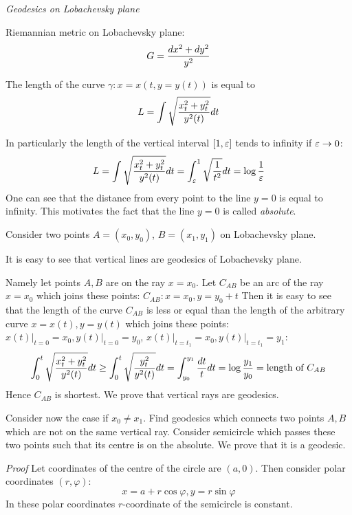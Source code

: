 \documentclass[12pt]{article}
\theoremstyle{theorem}
\numberwithin{equation}{section}
\begin{document}
{\bigskip

     {\it Geodesics on Lobachevsky plane}

     Riemannian metric on Lobachevsky plane:
            \begin{equation}\label{lobachmetric5}
               G={dx^2+dy^2\over y^2}
            \end{equation}



The length of the curve $\gamma\colon x=x(t, y=y(t))$ is equal to
                     $$
   L=\int\sqrt {{x_t^2+y_t^2\over y^2(t)}}dt
                        $$

In particularly the length of the vertical interval $[1,{\varepsilon}]$ tends
to infinity if ${\varepsilon}\to 0$:
                    $$
   L=\int\sqrt {{x_t^2+y_t^2\over y^2(t)}}dt=
   \int_{\varepsilon}^1\sqrt {{1\over t^2}}dt=\log {1\over {\varepsilon}}
                     $$
One can see that the distance from  every point to the line $y=0$ is
equal to infinity. This motivates the fact that the line $y=0$
is called {\it absolute}.

Consider two points $A=(x_0,y_0)$, $B=(x_1,y_1)$ on Lobachevsky plane.


It is easy to see that vertical lines are geodesics of Lobachevsky plane.

Namely let points $A, B$ are on the ray $x=x_0$.
Let  $C_{AB}$ be an arc of the ray $x=x_0$ which joins these points:
    $C_{AB}\colon x=x_0, y=y_0+t$
Then it is easy to see that the length of the curve $C_{AB}$ is less or equal than the length of the arbitrary curve
  $x=x(t),y=y(t)$ which joins these points: $x(t)\big\vert_{t=0}=x_0, y(t)\big\vert_{t=0}=y_0$,
$x(t)\big\vert_{t=t_1}=x_0, y(t)\big\vert_{t=t_1}=y_1$:
          $$
 \int_{0}^t\sqrt {x_t^2+y_t^2\over y^2(t)}dt\geq
 \int_{0}^t\sqrt {y_t^2\over y^2(t)}dt=\int_{y_0}^{y_1} {dt\over t}dt=\log {y_1\over y_0}=\hbox{length of $C_{AB}$}
          $$
Hence $C_{AB}$ is shortest. We prove that vertical rays are geodesics.

Consider now the case if $x_0\not=x_1$.
Find  geodesics which connects two points $A,B$ which are not on the same vertical ray.
Consider semicircle which passes
these two points such that its centre is on the absolute.
We prove that it is a geodesic.

\medskip
{\footnotesize
{\it Proof} Let coordinates of the centre of the circle
are $(a,0)$. Then consider polar coordinates $(r,\varphi)$:
\begin{equation}\label{semicircle}
  x=a+r\cos\varphi, y=r\sin\varphi
\end{equation}
In these polar coordinates $r$-coordinate of the semicircle is constant.

}}
\end{document}
